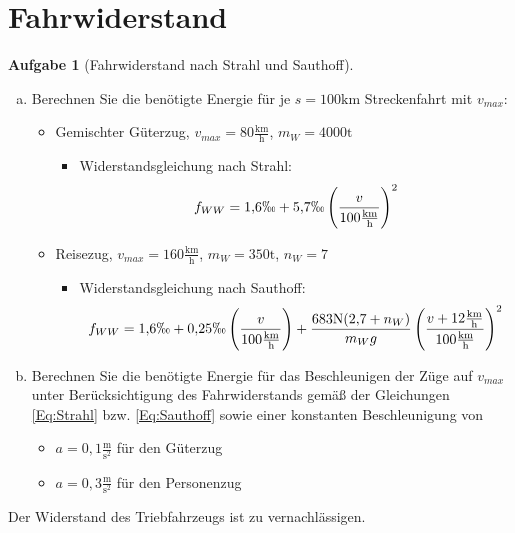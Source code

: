 \documentclass[10pt,a4paper,headsepline,smallheadings]{scrartcl}
\theoremstyle{definition}
\newtheorem{aufgabe}{Aufgabe}
\begin{document}
\section*{Fahrwiderstand}
\begin{aufgabe}[Fahrwiderstand nach Strahl und Sauthoff]
\begin{enumerate}[a)]
\item Berechnen Sie die ben\"otigte Energie f\"ur je $s = 100 \mathrm{km}$ Streckenfahrt mit $v_{max}$:
\begin{itemize}
		\item Gemischter G\"uterzug, $v_{max} = 80 \frac{\mathrm{km}}{\mathrm{h}}$, $m_{W} = 4000 \mathrm{t}$
		\begin{itemize}
		\item Widerstandsgleichung nach Strahl:
		\begin{equation}
		\label{Eq:Strahl}
			f_{WW} = 1{,}6 \permil +  5{,}7 \permil \left( \frac{v}{100 \frac{\mathrm{km}}{\mathrm{h}}} \right)^2
		\end{equation}
		\end{itemize}
		\item Reisezug, $v_{max} = 160 \frac{\mathrm{km}}{\mathrm{h}}$, $m_{W} = 350 \mathrm{t}$, $n_{W} = 7$
 		\begin{itemize}
		\item Widerstandsgleichung nach Sauthoff:
		\begin{equation}
		\label{Eq:Sauthoff}
			f_{WW} = 1{,}6 \permil + 0{,}25 \permil \left( \frac{v}{100 \frac{\mathrm{km}}{\mathrm{h}}} \right) + 
			\frac{683 \mathrm{N}(2{,}7 + n_{W}) }{m_{W} g} \left( \frac{v+ 12 \frac{\mathrm{km}}{\mathrm{h}}}{100 \frac{\mathrm{km}}{\mathrm{h}}} \right)^2
		\end{equation}
		\end{itemize}
		\end{itemize}
\item Berechnen Sie die ben\"otigte Energie f\"ur das Beschleunigen der Z\"uge auf $v_{max}$ unter Ber\"ucksichtigung des Fahrwiderstands gem\"a{\ss} der Gleichungen \eqref{Eq:Strahl} bzw. \eqref{Eq:Sauthoff} sowie einer konstanten Beschleunigung von
\begin{itemize}
		\item $a = 0{,}1 \frac{\mathrm{m}}{\mathrm{s}^2}$ f\"ur den G\"uterzug
		\item $a = 0{,}3 \frac{\mathrm{m}}{\mathrm{s}^2}$ f\"ur den Personenzug
		\end{itemize}
\end{enumerate}
Der Widerstand des Triebfahrzeugs ist zu vernachl\"assigen.
\end{aufgabe}
\end{document}
